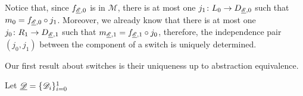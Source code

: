 \begin{remark}\label{rem:fact}
	Notice that, since $f_{\underline{\mathscr{E}}, 0}$ is in $\mathcal{M}$, there is at most one $j_1\colon L_0\to D_{\underline{\mathscr{E}},0}$ such that $m_0=f_{\underline{\mathscr{E}}, 0} \circ j_1$. Moreover, we already know that there is at most one $j_0\colon R_1\to D_{\underline{\mathscr{E}},1}$ such that $m_{\underline{\mathscr{E}},1}=f_{\underline{\mathscr{E}},1}\circ j_0$, therefore, the independence pair $(j_0,j_1)$ between the component of a switch is uniquely determined.
\end{remark}

Our first result about switches is their uniqueness up to abstraction equivalence.

\begin{theorem}\label{thm:switch_uni} Let $\underline{\mathscr{D}}=\{\mathscr{D}_i\}_{i=0}^1$  
	
\end{theorem}

